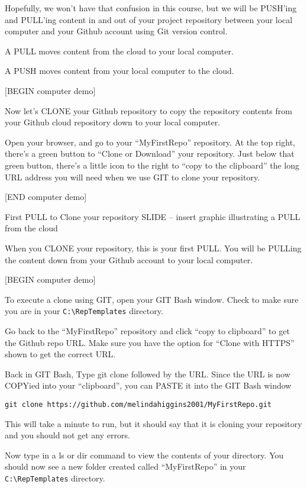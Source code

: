 \documentclass[
]{book}
\begin{document}
Hopefully, we won't have that confusion in this course, but we will be PUSH'ing and PULL'ing content in and out of your project repository between your local computer and your Github account using Git version control.

A PULL moves content from the cloud to your local computer.

A PUSH moves content from your local computer to the cloud.

{[}BEGIN computer demo{]}

Now let's CLONE your Github repository to copy the repository contents from your Github cloud repository down to your local computer.

Open your browser, and go to your ``MyFirstRepo'' repository. At the top right, there's a green button to ``Clone or Download'' your repository. Just below that green button, there's a little icon to the right to ``copy to the clipboard'' the long URL address you will need when we use GIT to clone your repository.

{[}END computer demo{]}

First PULL to Clone your repository SLIDE -- insert graphic illustrating a PULL from the cloud

When you CLONE your repository, this is your first PULL. You will be PULLing the content down from your Github account to your local computer.

{[}BEGIN computer demo{]}

To execute a clone using GIT, open your GIT Bash window. Check to make sure you are in your \texttt{C:\textbackslash{}RepTemplates} directory.

Go back to the ``MyFirstRepo'' repository and click ``copy to clipboard'' to get the Github repo URL. Make sure you have the option for ``Clone with HTTPS'' shown to get the correct URL.

Back in GIT Bash, Type git clone followed by the URL. Since the URL is now COPYied into your ``clipboard'', you can PASTE it into the GIT Bash window

\texttt{git\ clone\ https://github.com/melindahiggins2001/MyFirstRepo.git}

This will take a minute to run, but it should say that it is cloning your repository and you should not get any errors.

Now type in a ls or dir command to view the contents of your directory. You should now see a new folder created called ``MyFirstRepo'' in your \texttt{C:\textbackslash{}RepTemplates} directory.
\end{document}

